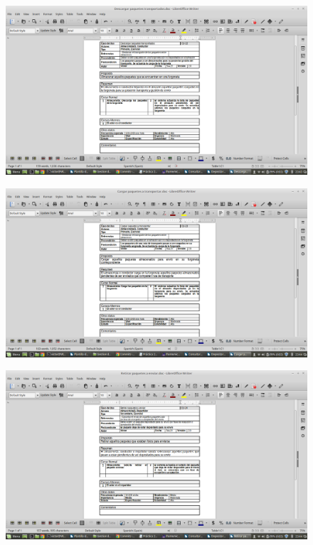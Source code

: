 \begin{figure}[H]
	\centering
	\includegraphics[width=20cm]{22}
\end{figure}
\begin{figure}[H]
	\centering
	\includegraphics[width=20cm]{23}
\end{figure}
\begin{figure}[H]
	\centering
	\includegraphics[width=20cm]{24}
\end{figure}
